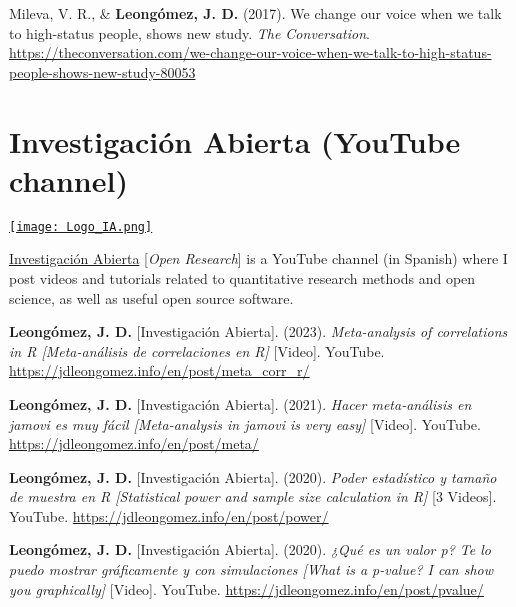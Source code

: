 \documentclass[11pt,a4paper,]{awesome-cv}
\begin{document}
Mileva, V. R., \& \textbf{Leongómez, J. D.} (2017). We change our voice
when we talk to high-status people, shows new study. \emph{The
Conversation}.
\url{https://theconversation.com/we-change-our-voice-when-we-talk-to-high-status-people-shows-new-study-80053}

\endgroup

\hypertarget{investigaciuxf3n-abierta-youtube-channel}{%
\section{Investigación Abierta (YouTube
channel)}\label{investigaciuxf3n-abierta-youtube-channel}}

\begin{minipage}[c]{0.15\linewidth}
\href{https://www.youtube.com/@InvestigacionAbierta}{\texttt{[image: Logo\_IA.png]}}
\end{minipage} \begin{minipage}[c]{0.85\linewidth}
\textcolor{red}{\faYoutube} \href{https://www.youtube.com/@InvestigacionAbierta}{Investigación Abierta} [\textit{Open Research}] is a YouTube channel (in Spanish) where I post videos and tutorials related to quantitative research methods and open science, as well as useful open source software.
\end{minipage}

\begingroup
\footnotesize
\setlength{\parindent}{-0.5in}
\setlength{\leftskip}{0.5in}

\textbf{Leongómez, J. D.} {[}Investigación Abierta{]}. (2023).
\emph{Meta-analysis of correlations in R {[}Meta-análisis de
correlaciones en R{]}} {[}Video{]}. YouTube.
\url{https://jdleongomez.info/en/post/meta_corr_r/}

\textbf{Leongómez, J. D.} {[}Investigación Abierta{]}. (2021).
\emph{Hacer meta-análisis en jamovi es muy fácil {[}Meta-analysis in
jamovi is very easy{]}} {[}Video{]}. YouTube.
\url{https://jdleongomez.info/en/post/meta/}

\textbf{Leongómez, J. D.} {[}Investigación Abierta{]}. (2020).
\emph{Poder estadístico y tamaño de muestra en R {[}Statistical power
and sample size calculation in R{]}} {[}3 Videos{]}. YouTube.
\url{https://jdleongomez.info/en/post/power/}

\textbf{Leongómez, J. D.} {[}Investigación Abierta{]}. (2020).
\emph{¿Qué es un valor p? Te lo puedo mostrar gráficamente y con
simulaciones {[}What is a p-value? I can show you graphically{]}}
{[}Video{]}. YouTube. \url{https://jdleongomez.info/en/post/pvalue/}
\end{document}
